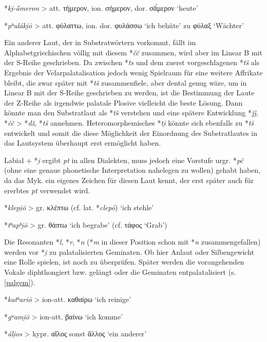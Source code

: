\documentclass[12pt,a4paper,normalheadings]{scrartcl}
\def\rek#1{\mbox{*\textit{#1}}}
\def\bel#1{\mbox{\textit{#1}}}
\begin{document}
\lex{\rek{(k, kʰ)i̯}}{\rek{čč}}

\rek{ki̯-ā́meron} > att. τήμερον, ion. σήμερον, dor. σᾱ́μερον `heute'

\rek{pʰuláki̯ō} > att. φύλαττω, ion. dor. φυλάσσω `ich behüte' zu φύλαξ `Wächter'

\bigskip\noindent
Ein anderer Laut, der in Substratwörtern vorkommt,
fällt im Alphabetgriechischen völlig mit diesem \rek{čč} zusammen,
wird aber im Linear B mit der S-Reihe geschrieben.
Da zwischen \rek{ts} und dem zuerst vorgeschlagenen \rek{tš} als Ergebnis
der Velarpalatalisation jedoch wenig Spielraum für eine weitere Affrikate bleibt,
die zwar später mit \rek{tš} zusammenfiele, aber dental genug wäre,
um in Linear B mit der S-Reihe geschrieben zu werden,
ist die Bestimmung der Laute der Z-Reihe als irgendwie palatale Plosive
vielleicht die beste Lösung.
Dann könnte man den Substratlaut als \rek{tš} verstehen
und eine spätere Entwicklung \rek{ǰǰ}, \rek{čč} > \rek{dž}, \rek{tš} annehmen.
Heteromorphemisches \rek{ti̯} könnte sich ebenfalls zu \rek{tš} entwickelt
und somit die diese Möglichkeit der Einordnung des Substratlautes in das
Lautsystem überhaupt erst ermöglicht haben.

Labial + \rek{i̯} ergibt \bel{pt} in allen Dialekten,
muss jedoch eine Vorstufe urgr. \rek{pč}
(ohne eine genaue phonetische Interpretation nahelegen zu wollen) gehabt haben,
da das Myk. ein eigenes Zeichen für diesen Laut kennt,
der erst später auch für ererbtes \bel{pt} verwendet wird.

\lex{\rek{\{Labial\}i̯}}{\rek{pč}}

\rek{klepi̯ō} > gr. κλέπτω (cf. lat. \rek{clepō}) `ich stehle'

\rek{tʰapʰi̯ō} > gr. θάπτω `ich begrabe' (cf. τάφος `Grab')

\bigskip\noindent
Die Resonanten \rek{l}, \rek{r}, \rek{n}
(\rek{m} in dieser Position schon mit \rek{n} zusammengefallen)
werden vor \rek{i̯} zu palatalisierten Geminaten.
Ob hier Anlaut oder Silbengewicht eine Rolle spielen, ist noch zu überprüfen.
Später werden die vorangehenden Vokale diphthongiert bzw. gelängt oder
die Geminaten entpalatalisiert (s. \ref{palgem}).

\lex{\rek{(l, r, n)i̯}}{\rek{(ĺĺ, ŕŕ, ńń)}}

\rek{katʰariō} > ion-att. καθαίρω `ich reinige'

\rek{gʷami̯ō} > ion-att. βαίνω `ich komme'

\rek{áli̯os} > kypr. αἴλος sonst ἄλλος `ein anderer'
\end{document}
